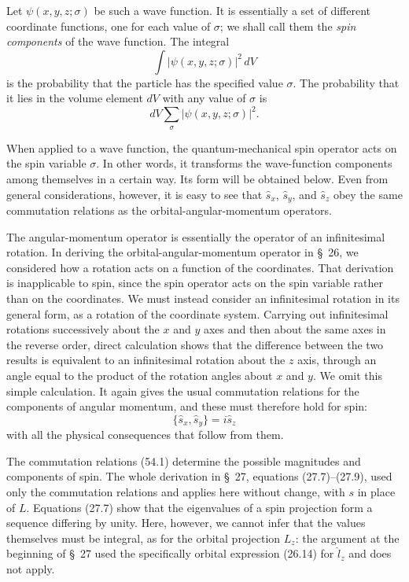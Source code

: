 Let $\psi(x,y,z;\sigma)$ be such a wave function. It is essentially a set of
different coordinate functions, one for each value of $\sigma$; we shall call
them the \emph{spin components} of the wave function. The integral
\[
 \int |\psi(x,y,z;\sigma)|^2\,dV
\]
is the probability that the particle has the specified value $\sigma$. The
probability that it lies in the volume element $dV$ with any value of
$\sigma$ is
\[
 dV\sum_\sigma |\psi(x,y,z;\sigma)|^2.
\]

When applied to a wave function, the quantum-mechanical spin operator acts on
the spin variable $\sigma$. In other words, it transforms the wave-function
components among themselves in a certain way. Its form will be obtained
below. Even from general considerations, however, it is easy to see that
$\hat s_x$, $\hat s_y$, and $\hat s_z$ obey the same commutation relations as
the orbital-angular-momentum operators.

The angular-momentum operator is essentially the operator of an infinitesimal
rotation. In deriving the orbital-angular-momentum operator in \S~26, we
considered how a rotation acts on a function of the coordinates. That
derivation is inapplicable to spin, since the spin operator acts on the spin
variable rather than on the coordinates. We must instead consider an
infinitesimal rotation in its general form, as a rotation of the coordinate
system. Carrying out infinitesimal rotations successively about the $x$ and
$y$ axes and then about the same axes in the reverse order, direct calculation
shows that the difference between the two results is equivalent to an
infinitesimal rotation about the $z$ axis, through an
angle equal to the product of the rotation angles about $x$ and $y$. We omit
this simple calculation. It again gives the usual commutation relations for
the components of angular momentum, and these must therefore hold for spin:
\begin{equation}
 \{\hat s_x,\hat s_y\}=i\hat s_z
 \tag{54.1}
\end{equation}
with all the physical consequences that follow from them.

The commutation relations (54.1) determine the possible magnitudes and
components of spin. The whole derivation in \S~27, equations (27.7)--(27.9),
used only the commutation relations and applies here without change, with $s$
in place of $L$. Equations (27.7) show that the eigenvalues of a spin
projection form a sequence differing by unity. Here, however, we cannot infer
that the values themselves must be integral, as for the orbital projection
$L_z$: the argument at the beginning of \S~27 used the specifically orbital
expression (26.14) for $\hat l_z$ and does not apply.

